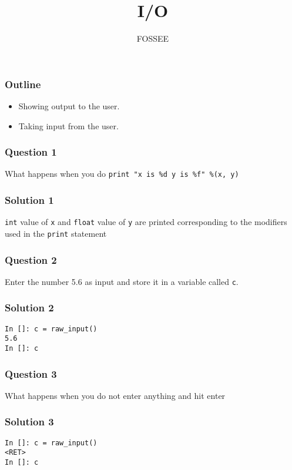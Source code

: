 \documentclass[presentation]{beamer}
\title{I/O}
\author{FOSSEE}
\date{}
\begin{document}
\maketitle









\begin{frame}
\frametitle{Outline}
\label{sec-1}

\begin{itemize}
\item Showing output to the user.
\item Taking input from the user.
\end{itemize}
\end{frame}
\begin{frame}
\frametitle{Question 1}
\label{sec-2}

  What happens when you do \texttt{print "x is \%d y is \%f" \%(x, y)}
\end{frame}
\begin{frame}
\frametitle{Solution 1}
\label{sec-3}

  \texttt{int} value of \texttt{x} and \texttt{float} value of \texttt{y} are printed corresponding to the
  modifiers used in the \texttt{print} statement
\end{frame}
\begin{frame}
\frametitle{Question 2}
\label{sec-4}

  Enter the number 5.6 as input and store it in a variable called
  \texttt{c}. 
\end{frame}
\begin{frame}[fragile]
\frametitle{Solution 2}
\label{sec-5}

\lstset{language=Python}
\begin{lstlisting}
In []: c = raw_input() 
5.6
In []: c
\end{lstlisting}
\end{frame}
\begin{frame}
\frametitle{Question 3}
\label{sec-6}

  What happens when you do not enter anything and hit enter
\end{frame}
\begin{frame}[fragile]
\frametitle{Solution 3}
\label{sec-7}

\lstset{language=Python}
\begin{lstlisting}
In []: c = raw_input() 
<RET>
In []: c
\end{lstlisting}
\end{frame}
\end{document}
